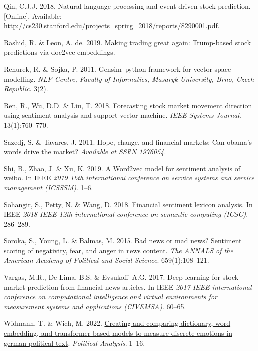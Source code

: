 \documentclass[11pt,preprint, authoryear]{elsarticle}
\numberwithin{equation}{section}
\numberwithin{figure}{section}
\numberwithin{table}{section}
\newlength{\cslhangindent}
\newenvironment{CSLReferences}%
  {\setlength{\parindent}{0pt}%
  \everypar{\setlength{\hangindent}{\cslhangindent}}\ignorespaces}%
  {\par}
\begin{document}
\begin{CSLReferences}{1}{0}
\leavevmode{}%
Qin, C.J.J. 2018. Natural language processing and event-driven stock
prediction. {[}Online{]}, Available:
\url{http://cs230.stanford.edu/projects_spring_2018/reports/8290001.pdf}.

\leavevmode{}%
Rashid, R. \& Leon, A. de. 2019. Making trading great again: Trump-based
stock predictions via doc2vec embeddings.

\leavevmode{}%
Rehurek, R. \& Sojka, P. 2011. Gensim--python framework for vector space
modelling. \emph{NLP Centre, Faculty of Informatics, Masaryk University,
Brno, Czech Republic}. 3(2).

\leavevmode{}%
Ren, R., Wu, D.D. \& Liu, T. 2018. Forecasting stock market movement
direction using sentiment analysis and support vector machine.
\emph{IEEE Systems Journal}. 13(1):760--770.

\leavevmode{}%
Sazedj, S. \& Tavares, J. 2011. Hope, change, and financial markets: Can
obama's words drive the market? \emph{Available at SSRN 1976054}.

\leavevmode{}%
Shi, B., Zhao, J. \& Xu, K. 2019. A Word2vec model for sentiment
analysis of weibo. In IEEE \emph{2019 16th international conference on
service systems and service management (ICSSSM)}. 1--6.

\leavevmode{}%
Sohangir, S., Petty, N. \& Wang, D. 2018. Financial sentiment lexicon
analysis. In IEEE \emph{2018 IEEE 12th international conference on
semantic computing (ICSC)}. 286--289.

\leavevmode{}%
Soroka, S., Young, L. \& Balmas, M. 2015. Bad news or mad news?
Sentiment scoring of negativity, fear, and anger in news content.
\emph{The ANNALS of the American Academy of Political and Social
Science}. 659(1):108--121.

\leavevmode{}%
Vargas, M.R., De Lima, B.S. \& Evsukoff, A.G. 2017. Deep learning for
stock market prediction from financial news articles. In IEEE \emph{2017
IEEE international conference on computational intelligence and virtual
environments for measurement systems and applications (CIVEMSA)}.
60--65.

\leavevmode{}%
Widmann, T. \& Wich, M. 2022.
\href{https://doi.org/10.1017/pan.2022.15}{Creating and comparing
dictionary, word embedding, and transformer-based models to measure
discrete emotions in german political text}. \emph{Political Analysis}.
1--16.


\end{CSLReferences}
\end{document}
